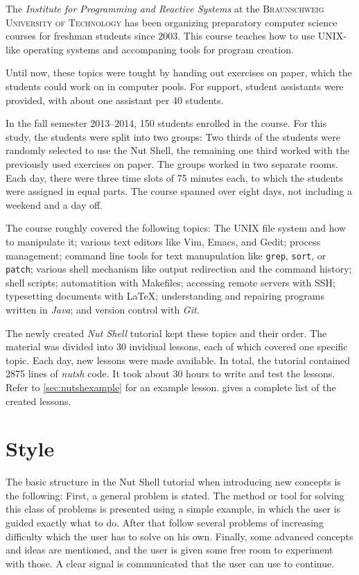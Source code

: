 \documentclass[paper=a4,twoside,abstract=on,cleardoublepage=empty,numbers=noenddot,toc=bib,12pt,appendixprefix=true]{scrreprt}
\begin{document}
The \textit{Institute for Programming and Reactive Systems} at the \textsc{Braunschweig University of Technology} has been organizing preparatory computer science courses for freshman students since 2003. This course teaches how to use UNIX-like operating systems and accompaning tools for program creation.

Until now, these topics were tought by handing out exercises on paper, which the students could work on in computer pools. For support, student assistants were provided, with about one assistant per 40 students.

In the fall semester 2013--2014, 150 students enrolled in the course. For this study, the students were split into two groups: Two thirds of the students were randomly selected to use the Nut Shell, the remaining one third worked with the previously used exercises on paper. The groups worked in two separate rooms. Each day, there were three time slots of 75 minutes each, to which the students were assigned in equal parts. The course spanned over eight days, not including a weekend and a day off.

The course roughly covered the following topics: The \textsc{UNIX} file system and how to manipulate it; various text editors like Vim, Emacs, and Gedit; process management; command line tools for text manupulation like \texttt{grep}, \texttt{sort}, or \texttt{patch}; various shell mechanism like output redirection and the command history; shell scripts; automatition with Makefiles; accessing remote servers with \textsc{SSH}; typesetting documents with \LaTeX; understanding and repairing programs written in \textit{Java}; and version control with \textit{Git}.

The newly created \textit{Nut Shell} tutorial kept these topics and their order. The material was divided into 30 invidiual lessons, each of which covered one specific topic. Each day, new lessons were made available. In total, the tutorial contained 2875 lines of \textit{nutsh} code. It took about 30 hours to write and test the lessons. Refer to \cref{sec:nutshexample} for an example lesson.  gives a complete list of the created lessons.

\section{Style}

The basic structure in the Nut Shell tutorial when introducing new concepts is the following: First, a general problem is stated. The method or tool for solving this class of problems is presented using a simple example, in which the user is guided exactly what to do. After that follow several problems of increasing difficulty which the user has to solve on his own. Finally, some advanced concepts and ideas are mentioned, and the user is given some free room to experiment with those. A clear signal is communicated that the user can use to continue.
\end{document}
